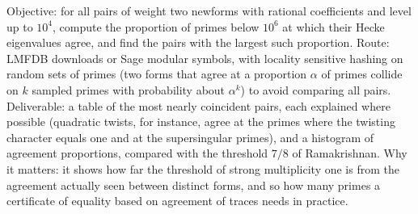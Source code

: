 \begin{compproblem}
Objective: for all pairs of weight two newforms with rational coefficients and level up to $10^4$, compute the proportion of primes below $10^6$ at which their Hecke eigenvalues agree, and find the pairs with the largest such proportion. Route: LMFDB downloads or Sage modular symbols, with locality sensitive hashing on random sets of primes (two forms that agree at a proportion $\alpha$ of primes collide on $k$ sampled primes with probability about $\alpha^k$) to avoid comparing all pairs. Deliverable: a table of the most nearly coincident pairs, each explained where possible (quadratic twists, for instance, agree at the primes where the twisting character equals one and at the supersingular primes), and a histogram of agreement proportions, compared with the threshold $7/8$ of Ramakrishnan. Why it matters: it shows how far the threshold of strong multiplicity one is from the agreement actually seen between distinct forms, and so how many primes a certificate of equality based on agreement of traces needs in practice.
\end{compproblem}
